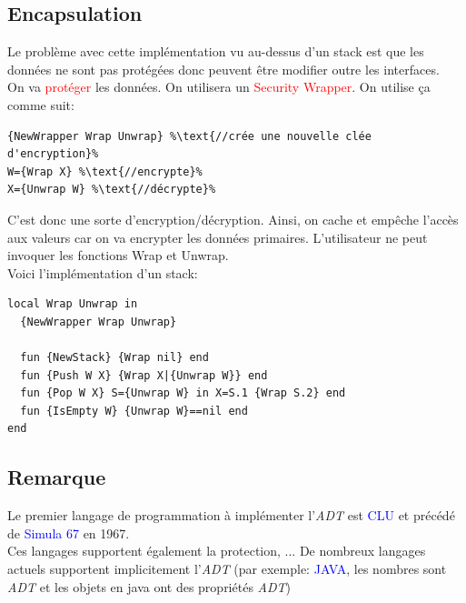 \documentclass{report}
\begin{document}
\subsection{Encapsulation}
Le problème avec cette implémentation vu au-dessus d'un stack est que les données ne sont pas protégées donc peuvent être modifier outre les interfaces.\\

On va \textcolor{red}{protéger} les données. On utilisera un \textcolor{red}{Security Wrapper}. On utilise ça comme suit:
\begin{lstlisting}[escapechar=\%]
{NewWrapper Wrap Unwrap} %\text{//crée une nouvelle clée d'encryption}%
W={Wrap X} %\text{//encrypte}%
X={Unwrap W} %\text{//décrypte}%
\end{lstlisting}
C'est donc une sorte d'encryption/décryption. Ainsi, on cache et empêche l'accès aux valeurs car on va encrypter les données primaires. L'utilisateur ne peut invoquer les fonctions Wrap et Unwrap.\\
Voici l'implémentation d'un stack:
\begin{lstlisting}[escapechar=\%]
local Wrap Unwrap in
  {NewWrapper Wrap Unwrap}

  fun {NewStack} {Wrap nil} end 
  fun {Push W X} {Wrap X|{Unwrap W}} end 
  fun {Pop W X} S={Unwrap W} in X=S.1 {Wrap S.2} end
  fun {IsEmpty W} {Unwrap W}==nil end
end
\end{lstlisting}

\subsection{Remarque}
Le premier langage de programmation à implémenter l'\textit{ADT} est \textcolor{blue}{CLU} et précédé de \textcolor{blue}{Simula 67} en 1967.\\
Ces langages supportent également la protection, ... De nombreux langages actuels supportent implicitement l'\textit{ADT} (par exemple: \textcolor{blue}{JAVA}, les nombres sont \textit{ADT} et les objets en java ont des propriétés \textit{ADT})
\end{document}
